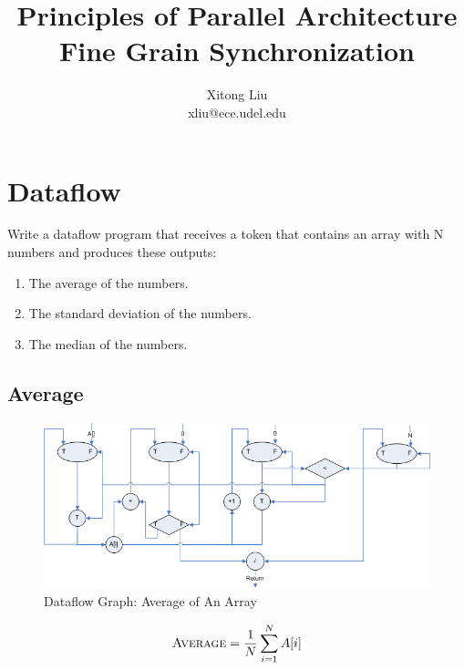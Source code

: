 \documentclass[12pt]{article}
\title{Principles of Parallel Architecture\\
Fine Grain Synchronization}
\author{Xitong Liu \\
xliu@ece.udel.edu}
\begin{document}
\maketitle

\section{Dataflow}
Write a dataflow program that receives a token that contains an 
array with N numbers and produces these outputs:
\begin{enumerate}
\item The average of the numbers.
\item The standard deviation of the numbers.
\item The median of the numbers.
\end{enumerate}
\subsection{Average}
\begin{figure}[h!]
	\begin{center}
		\includegraphics[width=1.1\textwidth, angle=0]{average.png}
		\caption{\label{fig:average}Dataflow Graph: Average of An Array}
	\end{center}
\end{figure}
\begin{equation}
\textsc{Average} = \frac{1}{N}\sum_{i=1}^{N}A[i]
\end{equation}
\end{document}
